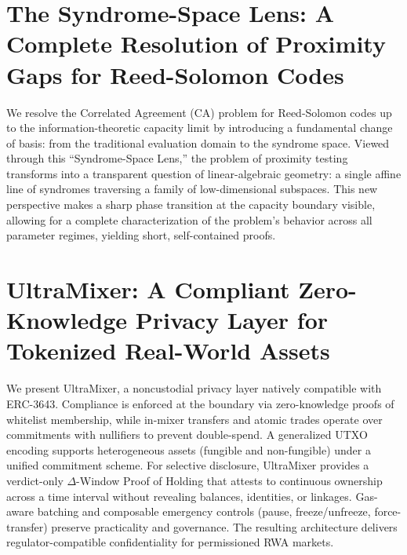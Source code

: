 \documentclass[11pt]{article}
\theoremstyle{definition}
\theoremstyle{remark}
\theoremstyle{plain}
\begin{document}
\section{\cite{cryptoeprint:2025/1712} The Syndrome-Space Lens: A Complete Resolution of Proximity Gaps for Reed-Solomon Codes}

We resolve the Correlated Agreement (CA) problem for Reed-Solomon codes up to the information-theoretic capacity limit by introducing a fundamental change of basis: from the traditional evaluation domain to the syndrome space. Viewed through this “Syndrome-Space Lens,” the problem of proximity testing transforms into a transparent question of linear-algebraic geometry: a single affine line of syndromes traversing a family of low-dimensional subspaces. This new perspective makes a sharp phase transition at the capacity boundary visible, allowing for a complete characterization of the problem's behavior across all parameter regimes, yielding short, self-contained proofs. 

\section{\cite{cryptoeprint:2025/1715} UltraMixer: A Compliant Zero-Knowledge Privacy Layer for Tokenized Real-World Assets}
We present UltraMixer, a noncustodial privacy layer natively compatible with ERC-3643. Compliance is enforced at the boundary via zero-knowledge proofs of whitelist membership, while in-mixer transfers and atomic trades operate over commitments with nullifiers to prevent double-spend. A generalized UTXO encoding supports heterogeneous assets (fungible and non-fungible) under a unified commitment scheme. For selective disclosure, UltraMixer provides a verdict-only $\Delta$-Window Proof of Holding that attests to continuous ownership across a time interval without revealing balances, identities, or linkages. Gas-aware batching and composable emergency controls (pause, freeze/unfreeze, force-transfer) preserve practicality and governance. The resulting architecture delivers regulator-compatible confidentiality for permissioned RWA markets.
\end{document}
